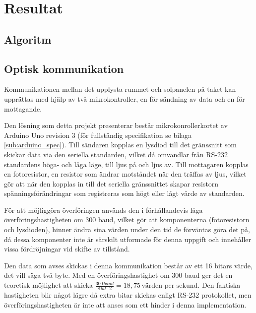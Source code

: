 \section{Resultat} %
\label{sec:resultat}
    \subsection{Algoritm} %
    \label{sub:algoritm}

    \subsection{Optisk kommunikation} %
    \label{sub:optisk_kommunikation}

        Kommunikationen mellan det upplysta rummet och solpanelen på taket kan upprättas med hjälp av två mikrokontroller, en för sändning av data och en för mottagande.\bigskip

        Den lösning som detta projekt presenterar består mikrokonrollerkortet av Arduino Uno revision 3 (för fullständig specifikation se bilaga \ref{sub:arduino_spec})\cite{ardu}. Till sändaren kopplas en lysdiod till det gränssnitt som skickar data via den seriella standarden, vilket då omvandlar från RS-232 standardens höga- och låga läge, till ljus på och ljus av. Till mottagaren kopplas en fotoresistor, en resistor som ändrar motståndet när den träffas av ljus, vilket gör att när den kopplas in till det seriella gränssnittet skapar resistorn spänningsförändringar som registreras som högt eller lågt värde av standarden. \bigskip

        För att möjliggöra överföringen används den i förhållandevis låga överföringshastigheten om 300 baud, vilket gör att komponenterna (fotoresistorn och lysdioden), hinner ändra sina värden under den tid de förväntas göra det på, då dessa komponenter inte är särskilt utformade för denna uppgift och innehåller vissa fördröjningar vid skifte av tillstånd. \bigskip

        Den data som avses skickas i denna kommunikation består av ett 16 bitars värde, det vill säga två byte. Med en överföringshastighet om 300 baud ger det en teoretisk möjlighet att skicka $\frac{300 \,\textit{baud}}{8 \, bit \cdot 2} = 18,75 \, \text{värden per sekund}$. Den faktiska hastigheten blir något lägre då extra bitar skickas enligt RS-232 protokollet, men överföringshastigheten är inte att anses som ett hinder i denna implementation.

